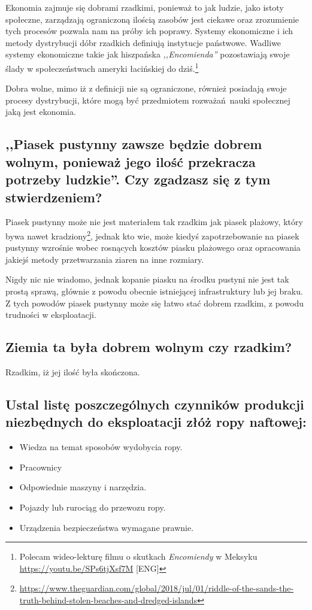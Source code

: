 \documentclass[a4paper,12pt]{article}
\begin{document}
Ekonomia zajmuje się dobrami rzadkimi, ponieważ to jak ludzie, jako istoty społeczne, zarządzają ograniczoną ilością zasobów jest ciekawe oraz zrozumienie tych procesów pozwala nam na próby ich poprawy. Systemy ekonomiczne i ich metody dystrybucji dóbr rzadkich definiują instytucje państwowe. Wadliwe systemy ekonomiczne takie jak hiszpańska \emph{,,Encomienda''} pozostawiają swoje ślady w społeczeństwach ameryki łacińskiej do dziś.\footnote{Polecam wideo-lekturę filmu o skutkach \emph{Encomiendy} w Meksyku \url{https://youtu.be/SPs6tjXsf7M} [ENG]}

Dobra wolne, mimo iż z definicji nie są ograniczone, również posiadają swoje procesy dystrybucji, które mogą być przedmiotem rozważań nauki społecznej jaką jest ekonomia.

\subsection{,,Piasek pustynny zawsze będzie dobrem wolnym, ponieważ jego ilość przekracza potrzeby ludzkie''. Czy zgadzasz się z tym stwierdzeniem?}

Piasek pustynny może nie jest materiałem tak rzadkim jak piasek plażowy, który bywa nawet kradziony\footnote{\tiny{\url{https://www.theguardian.com/global/2018/jul/01/riddle-of-the-sands-the-truth-behind-stolen-beaches-and-dredged-islands}}}, jednak kto wie, może kiedyś zapotrzebowanie na piasek pustynny wzrośnie wobec rosnących kosztów piasku plażowego oraz opracowania jakiejś metody przetwarzania ziaren na inne rozmiary.

Nigdy nic nie wiadomo, jednak kopanie piasku na środku pustyni nie jest tak prostą sprawą, głównie z powodu obecnie istniejącej infrastruktury lub jej braku. Z tych powodów piasek pustynny może się łatwo stać dobrem rzadkim, z powodu trudności w eksploatacji.

\subsection{Ziemia ta była dobrem wolnym czy rzadkim?}

Rzadkim, iż jej ilość była skończona.

\subsection{Ustal listę poszczególnych czynników produkcji niezbędnych do eksploatacji złóż ropy naftowej:}
\begin{itemize}
	\item Wiedza na temat sposobów wydobycia ropy.
	\item Pracownicy
	\item Odpowiednie maszyny i narzędzia.
	\item Pojazdy lub rurociąg do przewozu ropy.
	\item Urządzenia bezpieczeństwa wymagane prawnie.
\end{itemize}
\end{document}
